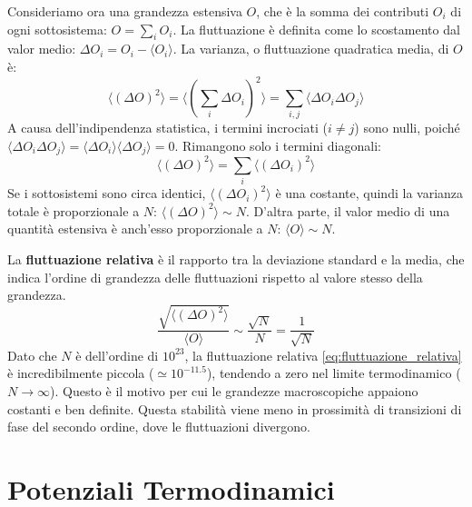Consideriamo ora una grandezza estensiva $O$, che è la somma dei contributi $O_i$ di ogni sottosistema: $O = \sum_i O_i$. La fluttuazione è definita come lo scostamento dal valor medio: $\Delta O_i = O_i - \langle O_i \rangle$. La varianza, o fluttuazione quadratica media, di $O$ è:
\begin{equation}
    \langle(\Delta O)^{2}\rangle=\langle(\sum_{i}\Delta O_{i})^{2}\rangle=\sum_{i,j}\langle\Delta O_{i}\Delta O_{j}\rangle
    \label{eq:varianza}
\end{equation}
A causa dell'indipendenza statistica, i termini incrociati ($i \neq j$) sono nulli, poiché $\langle\Delta O_i \Delta O_j\rangle = \langle\Delta O_i\rangle\langle\Delta O_j\rangle = 0$. Rimangono solo i termini diagonali:
\begin{equation}
    \langle(\Delta O)^{2}\rangle=\sum_{i}\langle(\Delta O_{i})^{2}\rangle
    \label{eq:varianza_diag}
\end{equation}
Se i sottosistemi sono circa identici, $\langle(\Delta O_{i})^{2}\rangle$ è una costante, quindi la varianza totale è proporzionale a $N$: $\langle(\Delta O)^{2}\rangle \sim N$. D'altra parte, il valor medio di una quantità estensiva è anch'esso proporzionale a $N$: $\langle O \rangle \sim N$.

La \textbf{fluttuazione relativa} è il rapporto tra la deviazione standard e la media, che indica l'ordine di grandezza delle fluttuazioni rispetto al valore stesso della grandezza.
\begin{equation}
    \frac{\sqrt{\langle(\Delta O)^{2}\rangle}}{\langle O\rangle} \sim \frac{\sqrt{N}}{N} = \frac{1}{\sqrt{N}}
    \label{eq:fluttuazione_relativa}
\end{equation}
Dato che $N$ è dell'ordine di $10^{23}$, la fluttuazione relativa \eqref{eq:fluttuazione_relativa} è incredibilmente piccola ($\simeq 10^{-11.5}$), tendendo a zero nel limite termodinamico ($N \rightarrow \infty$). Questo è il motivo per cui le grandezze macroscopiche appaiono costanti e ben definite. Questa stabilità viene meno in prossimità di transizioni di fase del secondo ordine, dove le fluttuazioni divergono.

\section{Potenziali Termodinamici}

